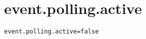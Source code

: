 \section{event.polling.active}
\label{configuration:EventPollingActive}
\AvailableInJavaAndCsharp{\TODO}
\begin{lstlisting}[style=Props,caption={Usage example for \textit{event.polling.active}}]
event.polling.active=false
\end{lstlisting}